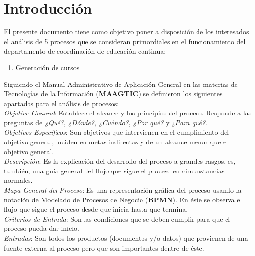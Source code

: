 \newpage
\section{Introducción}
\begin{footnotesize}	
	El presente documento tiene como objetivo poner a disposición de los interesados el análisis de 5 procesos que se consideran primordiales en el funcionamiento del departamento de coordinación de educación continua:\\

\begin{enumerate}
\item Generación de cursos
\end{enumerate}

Siguiendo el Manual Administrativo de Aplicación General en las materias de Tecnologías de la Información (\textbf{MAAGTIC}) se definieron los siguientes apartados para el análisis de procesos:\\

\textit{Objetivo General}: Establece el alcance y los principios del proceso. Responde a las preguntas de \textit{¿Qué?}, \textit{¿Dónde?}, \textit{¿Cuándo?}, \textit{¿Por qué?} y \textit{¿Para qué?}.\\

\textit{Objetivos Específicos}: Son objetivos que intervienen en el cumplimiento del objetivo general, inciden en metas indirectas y de un alcance menor que el objetivo general.\\

\textit{Descripción}: Es la explicación del desarrollo del proceso a grandes rasgos, es, también, una guía general del flujo que sigue el proceso en circunstancias normales.\\

\textit{Mapa General del Proceso}: Es una representación gráfica del proceso usando la notación de Modelado de Procesos de Negocio (\textbf{BPMN}). En éste se observa el flujo que sigue el proceso desde que inicia hasta que termina.\\

\textit{Criterios de Entrada}: Son las condiciones que se deben cumplir para que el proceso pueda dar inicio.\\

\textit{Entradas}: Son todos los productos (documentos y/o datos) que provienen de una fuente externa al proceso pero que son importantes dentre de éste.\\


\end{footnotesize}
